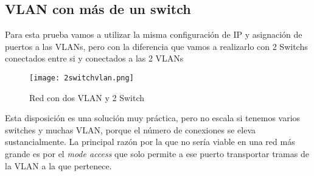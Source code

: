 \documentclass{article}
\begin{document}
\subsection{VLAN con más de un switch}
Para esta prueba vamos a utilizar la misma configuración de IP y asignación de puertos a las VLANs, pero con la diferencia que vamos a realizarlo con 2 Switchs conectados entre si y conectados a las 2 VLANs

\begin{figure}[H]
    \centering
    \texttt{[image: 2switchvlan.png]}
    \caption{Red con dos VLAN y 2 Switch}
    \label{fig:enter-label}
\end{figure}
Esta disposición es una solución muy práctica, pero no escala si tenemos varios switches y muchas VLAN, porque el número de conexiones se eleva sustancialmente. La principal razón por la que no sería viable en una red más grande es por el \textit{mode access} que solo permite a ese puerto transportar tramas de la VLAN a la que pertenece.
\end{document}
